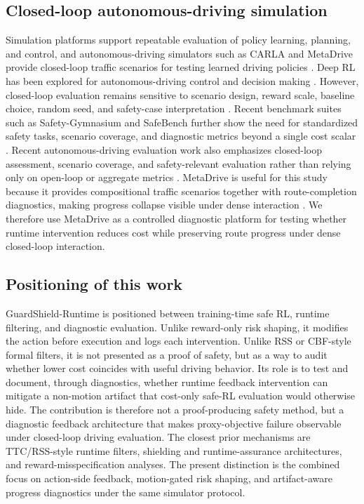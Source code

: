 \documentclass[pdflatex,sn-mathphys-ay]{sn-jnl}
\begin{document}
\subsection{Closed-loop autonomous-driving simulation}
Simulation platforms support repeatable evaluation of policy learning, planning, and control, and autonomous-driving simulators such as CARLA and MetaDrive provide closed-loop traffic scenarios for testing learned driving policies \citep{dosovitskiy2017carla,li2022metadrive}. Deep RL has been explored for autonomous-driving control and decision making \citep{sallab2017deep,kendall2019learning,grigorescu2020survey,kiran2021deep,kuutti2021survey}. However, closed-loop evaluation remains sensitive to scenario design, reward scale, baseline choice, random seed, and safety-case interpretation \citep{koopman2017autonomous,henderson2018deep}. Recent benchmark suites such as Safety-Gymnasium and SafeBench further show the need for standardized safety tasks, scenario coverage, and diagnostic metrics beyond a single cost scalar \citep{ji2023safetygymnasium,xu2022safebench}. Recent autonomous-driving evaluation work also emphasizes closed-loop assessment, scenario coverage, and safety-relevant evaluation rather than relying only on open-loop or aggregate metrics \citep{feng2023dense,jia2024bench2drive}. MetaDrive is useful for this study because it provides compositional traffic scenarios together with route-completion diagnostics, making progress collapse visible under dense interaction \citep{li2022metadrive}. We therefore use MetaDrive as a controlled diagnostic platform for testing whether runtime intervention reduces cost while preserving route progress under dense closed-loop interaction.

\subsection{Positioning of this work}
GuardShield-Runtime is positioned between training-time safe RL, runtime filtering, and diagnostic evaluation. Unlike reward-only risk shaping, it modifies the action before execution and logs each intervention. Unlike RSS or CBF-style formal filters, it is not presented as a proof of safety, but as a way to audit whether lower cost coincides with useful driving behavior. Its role is to test and document, through diagnostics, whether runtime feedback intervention can mitigate a non-motion artifact that cost-only safe-RL evaluation would otherwise hide. The contribution is therefore not a proof-producing safety method, but a diagnostic feedback architecture that makes proxy-objective failure observable under closed-loop driving evaluation. The closest prior mechanisms are TTC/RSS-style runtime filters, shielding and runtime-assurance architectures, and reward-misspecification analyses. The present distinction is the combined focus on action-side feedback, motion-gated risk shaping, and artifact-aware progress diagnostics under the same simulator protocol.
\end{document}
